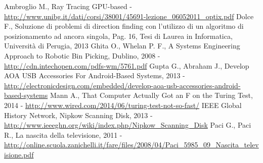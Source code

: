 \begin{thebibliography}{10}
\fancyfoot[C]{\thepage } 
Ambroglio M., Ray Tracing GPU-based - \url{http://www.unibg.it/dati/corsi/38001/45691-lezione_06052011_optix.pdf}
Dolce F., Soluzione di problemi di direction finding con l'utilizzo di un algoritmo di posizionamento ad ancora singola, Pag. 16, Tesi di Laurea in Informatica, Università di Perugia, 2013
Ghita O., Whelan P. F., A Systems Engineering Approach to Robotic Bin Picking, Dublino, 2008 - \url{http://cdn.intechopen.com/pdfs-wm/5761.pdf}
Gupta G., Abraham J., Develop AOA USB Accessories For Android-Based Systems, 2013 - \url{http://electronicdesign.com/embedded/develop-aoa-usb-accessories-android-based-systems}
Mann A., That Computer Actually Got an F on the Turing Test, 2014 - \url{http://www.wired.com/2014/06/turing-test-not-so-fast/}
IEEE Global History Network, Nipkow Scanning Disk, 2013 - \url{http://www.ieeeghn.org/wiki/index.php/Nipkow_Scanning_Disk}
Paci G., Paci R., La nascita della televisione, 2011 - \url{http://online.scuola.zanichelli.it/fare/files/2008/04/Paci_5985_09_Nascita_televisione.pdf}

\end{thebibliography}